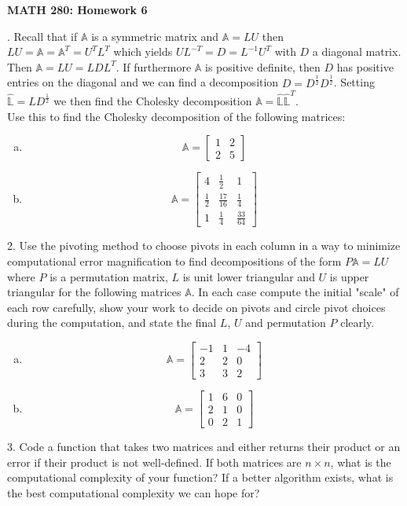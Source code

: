 \documentclass[12 pt]{article}
\begin{document}
\centerline{\bf MATH 280: Homework 6} 

\bigskip

\noindent

. Recall that if $\mathbb{A}$ is a symmetric matrix and $\mathbb{A}=LU$ then
\\ $LU=\mathbb{A}=\mathbb{A}^T=U^TL^T$ which yields $UL^{-T}=D=L^{-1}U^T$ with
$D$ a diagonal matrix. Then $\mathbb{A}=LU=LDL^T$. If furthermore $\mathbb{A}$ is positive definite, then $D$ has positive entries on the diagonal and we can find a decomposition $D=D^{\frac{1}{2}} D^{\frac{1}{2}}$. Setting $\mathbb{\hat{L}}=LD^{\frac{1}{2}}$ we then find the Cholesky decomposition
$\mathbb{A}=\hat{\mathbb{L}}\hat{\mathbb{L}}^T$. \\
Use this to find the Cholesky decomposition of the following matrices:
\begin{enumerate}[a)]
  \item
$$
\mathbb{A}=\begin{bmatrix} 1 & 2 \\ 2 & 5 \end{bmatrix}
$$
\item
$$
\mathbb{A}=\begin{bmatrix} 4 & \frac{1}{2} & 1 \\ \frac{1}{2} & \frac{17}{16} & \frac{1}{4} \\  1 & \frac{1}{4} & \frac{33}{64} \end{bmatrix}
$$
\end{enumerate}
2. Use the pivoting method to choose pivots in each column in a way to minimize computational error magnification to find decompositions
of the form $P\mathbb{A} = LU$ where $P$ is a permutation matrix, $L$ is unit lower triangular and $U$ is upper triangular for the following matrices
$\mathbb{A}$. In each case compute the initial "scale" of each row carefully, show your work to decide on pivots and circle pivot choices during the computation, and state the final $L$, $U$ and permutation $P$ clearly.
\begin{enumerate}[a)]
  \item
$$
\mathbb{A} = \begin{bmatrix} -1 & 1 & -4 \\ 2 & 2 & 0 \\ 3 & 3 & 2 \end{bmatrix}
$$
\item
$$
\mathbb{A} = \begin{bmatrix} 1 & 6 & 0 \\ 2 & 1 & 0 \\ 0 & 2 & 1 \end{bmatrix}
$$
\end{enumerate}
3. Code a function that takes two matrices and either returns their
product or an error if their product is not
well-defined. If both matrices are $n \times n$, what is the computational
complexity of your function? If a better algorithm exists, what is the best
computational complexity we can hope for?
\end{document}
